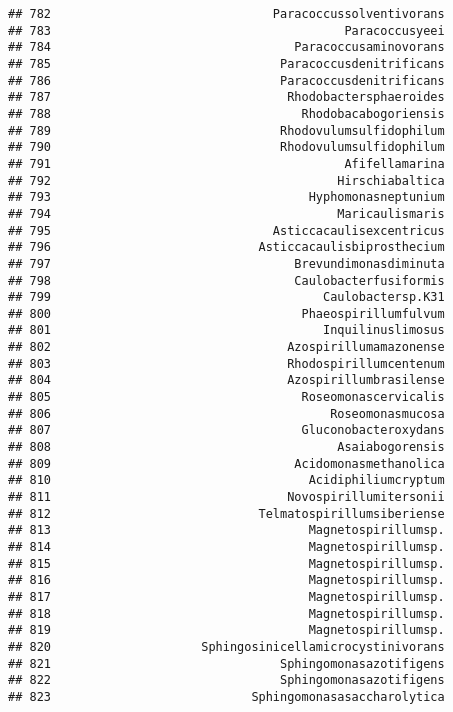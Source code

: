 \documentclass[
]{article}
\begin{document}
\begin{verbatim}
## 782                               Paracoccussolventivorans
## 783                                         Paracoccusyeei
## 784                                  Paracoccusaminovorans
## 785                                Paracoccusdenitrificans
## 786                                Paracoccusdenitrificans
## 787                                 Rhodobactersphaeroides
## 788                                   Rhodobacabogoriensis
## 789                                Rhodovulumsulfidophilum
## 790                                Rhodovulumsulfidophilum
## 791                                         Afifellamarina
## 792                                        Hirschiabaltica
## 793                                    Hyphomonasneptunium
## 794                                        Maricaulismaris
## 795                               Asticcacaulisexcentricus
## 796                             Asticcacaulisbiprosthecium
## 797                                  Brevundimonasdiminuta
## 798                                  Caulobacterfusiformis
## 799                                      Caulobactersp.K31
## 800                                   Phaeospirillumfulvum
## 801                                      Inquilinuslimosus
## 802                                 Azospirillumamazonense
## 803                                 Rhodospirillumcentenum
## 804                                 Azospirillumbrasilense
## 805                                   Roseomonascervicalis
## 806                                       Roseomonasmucosa
## 807                                   Gluconobacteroxydans
## 808                                        Asaiabogorensis
## 809                                  Acidomonasmethanolica
## 810                                    Acidiphiliumcryptum
## 811                                 Novospirillumitersonii
## 812                             Telmatospirillumsiberiense
## 813                                    Magnetospirillumsp.
## 814                                    Magnetospirillumsp.
## 815                                    Magnetospirillumsp.
## 816                                    Magnetospirillumsp.
## 817                                    Magnetospirillumsp.
## 818                                    Magnetospirillumsp.
## 819                                    Magnetospirillumsp.
## 820                     Sphingosinicellamicrocystinivorans
## 821                                Sphingomonasazotifigens
## 822                                Sphingomonasazotifigens
## 823                            Sphingomonasasaccharolytica

\end{verbatim}
\end{document}
